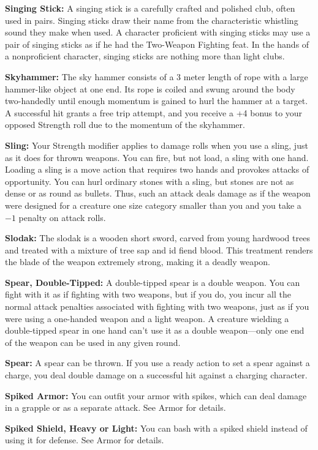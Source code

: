 \textbf{Singing Stick:} A singing stick is a carefully crafted and polished club, often used in pairs. Singing sticks draw their name from the characteristic whistling sound they make when used. A character proficient with singing sticks may use a pair of singing sticks as if he had the Two-Weapon Fighting feat. In the hands of a nonproficient character, singing sticks are nothing more than light clubs.

\textbf{Skyhammer:} The sky hammer consists of a 3 meter length of rope with a large hammer-like object at one end. Its rope is coiled and swung around the body two-handedly until enough momentum is gained to hurl the hammer at a target. A successful hit grants a free trip attempt, and you receive a +4 bonus to your opposed Strength roll due to the momentum of the skyhammer.

\textbf{Sling:} Your Strength modifier applies to damage rolls when you use a sling, just as it does for thrown weapons. You can fire, but not load, a sling with one hand. Loading a sling is a move action that requires two hands and provokes attacks of opportunity.  You can hurl ordinary stones with a sling, but stones are not as dense or as round as bullets. Thus, such an attack deals damage as if the weapon were designed for a creature one size category smaller than you and you take a $-1$ penalty on attack rolls. 

\textbf{Slodak:} The slodak is a wooden short sword, carved from young hardwood trees and treated with a mixture of tree sap and id fiend blood. This treatment renders the blade of the weapon extremely strong, making it a deadly weapon.

\textbf{Spear, Double-Tipped:} A double-tipped spear is a double weapon. You can fight with it as if fighting with two weapons, but if you do, you incur all the normal attack penalties associated with fighting with two weapons, just as if you were using a one-handed weapon and a light weapon. A creature wielding a double-tipped spear in one hand can't use it as a double weapon---only one end of the weapon can be used in any given round.

\textbf{Spear:} A spear can be thrown. If you use a ready action to set a spear against a charge, you deal double damage on a successful hit against a charging character. 

\textbf{Spiked Armor:} You can outfit your armor with spikes, which can deal damage in a grapple or as a separate attack. See Armor for details. 

\textbf{Spiked Shield, Heavy or Light:} You can bash with a spiked shield instead of using it for defense. See Armor for details. 

